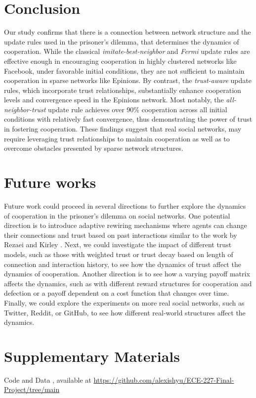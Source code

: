 \section{Conclusion}
Our study confirms that there is a connection between network structure and the update rules used in the prisoner's dilemma, that determines the dynamics of cooperation. 
While the classical \emph{imitate-best-neighbor} and \emph{Fermi} update rules are effective enough in encouraging cooperation in highly clustered networks like Facebook, under favorable initial conditions,
they are not sufficient to maintain cooperation in sparse networks like Epinions. By contrast, the \emph{trust-aware} update rules, which incorporate trust relationships, 
substantially enhance cooperation levels and convergence speed in the Epinions network.
Most notably, the \emph{all-neighbor-trust} update rule achieves over 90\% cooperation across all initial conditions with relatively fast convergence, thus demonstrating the power of trust in fostering cooperation.
These findings suggest that real social networks, may require leveraging trust relationships to maintain cooperation as well as to overcome obstacles presented by sparse network structures.

\section{Future works}
Future work could proceed in several directions to further explore the dynamics of cooperation in the prisoner's dilemma on social networks.
One potential direction is to introduce adaptive rewiring mechanisms where agents can change their connections and trust based on past interactions similar to the work by Rezaei and Kirley \cite{RezaeiKirley2012}.
Next, we could investigate the impact of different trust models, such as those with weighted trust or trust decay based on length of connection and interaction history, to see how the dynamics of trust affect the dynamics of cooperation.
Another direction is to see how a varying payoff matrix affects the dynamics, such as with different reward structures for cooperation and defection or a payoff dependent on a cost function that changes over time.
Finally, we could explore the experiments on more real social networks, such as Twitter, Reddit, or GitHub, to see how different real-world structures affect the dynamics.

\section{Supplementary Materials}
Code and Data \cite{LeskovecHuttenlocherKleinberg2010,McAuleyLeskovec2012}, available at \url{https://github.com/alexishyu/ECE-227-Final-Project/tree/main}